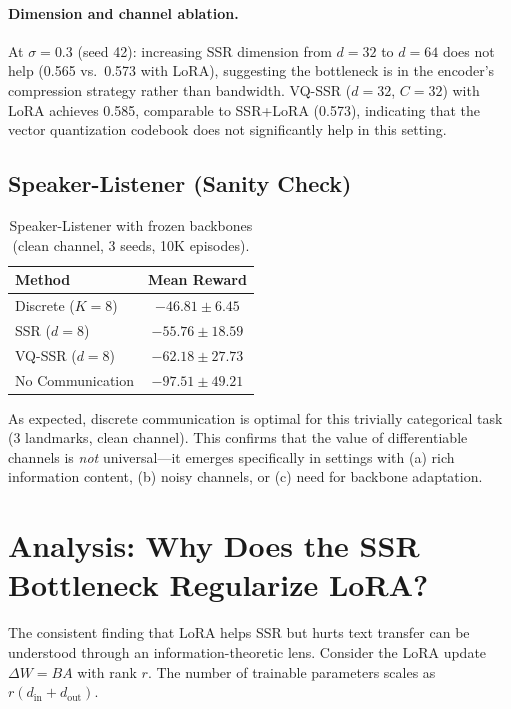 \documentclass[11pt,a4paper]{article}
\begin{document}
\paragraph{Dimension and channel ablation.}
At $\sigma{=}0.3$ (seed 42): increasing SSR dimension from $d{=}32$ to $d{=}64$ does not help (0.565 vs.\ 0.573 with LoRA), suggesting the bottleneck is in the encoder's compression strategy rather than bandwidth. VQ-SSR ($d{=}32$, $C{=}32$) with LoRA achieves 0.585, comparable to SSR+LoRA (0.573), indicating that the vector quantization codebook does not significantly help in this setting.

\subsection{Speaker-Listener (Sanity Check)}

\begin{table}[h]
\centering
\caption{Speaker-Listener with frozen backbones (clean channel, 3 seeds, 10K episodes).}
\vspace{0.3em}
\begin{tabular}{@{}lc@{}}
\toprule
\textbf{Method} & \textbf{Mean Reward} \\
\midrule
Discrete ($K{=}8$) & $\mathbf{-46.81 \pm 6.45}$ \\
SSR ($d{=}8$)       & $-55.76 \pm 18.59$ \\
VQ-SSR ($d{=}8$)    & $-62.18 \pm 27.73$ \\
No Communication    & $-97.51 \pm 49.21$ \\
\bottomrule
\end{tabular}
\end{table}

As expected, discrete communication is optimal for this trivially categorical task (3 landmarks, clean channel). This confirms that the value of differentiable channels is \emph{not} universal---it emerges specifically in settings with (a) rich information content, (b) noisy channels, or (c) need for backbone adaptation.

\section{Analysis: Why Does the SSR Bottleneck Regularize LoRA?}

The consistent finding that LoRA helps SSR but hurts text transfer can be understood through an information-theoretic lens. Consider the LoRA update $\Delta W = BA$ with rank $r$. The number of trainable parameters scales as $r(d_{\mathrm{in}} + d_{\mathrm{out}})$.
\end{document}
